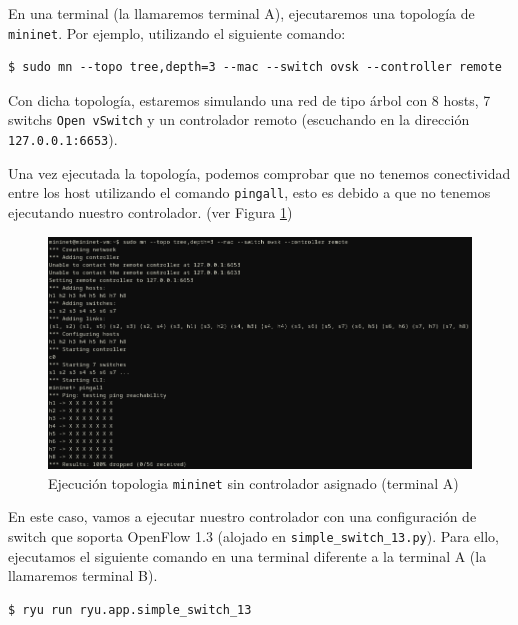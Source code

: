 \documentclass[a4paper, oneside, 12pt]{book}
\begin{document}
	\noindent En una terminal (la llamaremos terminal A), ejecutaremos una topología de \texttt{mininet}. Por ejemplo, utilizando el siguiente comando:
	\begin{verbatim}
$ sudo mn --topo tree,depth=3 --mac --switch ovsk --controller remote
	\end{verbatim}

	\noindent Con dicha topología, estaremos simulando una red de tipo árbol con 8 hosts, 7 switchs \texttt{Open vSwitch} y un controlador remoto (escuchando en la dirección \texttt{127.0.0.1:6653}). 
	
	\pagebreak
	
	\noindent Una vez ejecutada la topología, podemos comprobar que no tenemos conectividad entre los host utilizando el comando \texttt{pingall}, esto es debido a que no tenemos ejecutando nuestro controlador. (ver Figura \ref{img: mn ryu 1})
	
	\begin{figure}[h!]
		\begin{center}
			\includegraphics[width=1\textwidth]{img/mn_ryu_1.png}
			\caption{Ejecución topologia \texttt{mininet} sin controlador asignado (terminal A)}
			\label{img: mn ryu 1}	
		\end{center}
	\end{figure}
	
	\noindent En este caso, vamos a ejecutar nuestro controlador con una configuración de switch que soporta OpenFlow 1.3 (alojado en \texttt{simple\_switch\_13.py}). Para ello, ejecutamos el siguiente comando en una terminal diferente a la terminal A (la llamaremos terminal B).
	
	\begin{verbatim}
$ ryu run ryu.app.simple_switch_13
	\end{verbatim}
	
\end{document}
